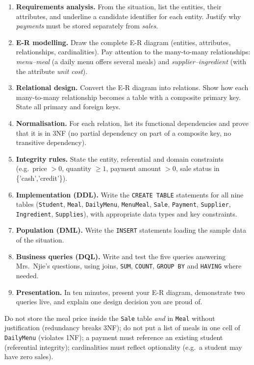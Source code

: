 \documentclass[11pt]{article}
\begin{document}
\begin{enumerate}
\item \textbf{Requirements analysis.} From the situation, list the entities, their attributes, and underline a candidate identifier for each entity. Justify why \emph{payments} must be stored separately from \emph{sales}.
\item \textbf{E-R modelling.} Draw the complete E-R diagram (entities, attributes, relationships, cardinalities). Pay attention to the many-to-many relationships: \emph{menu--meal} (a daily menu offers several meals) and \emph{supplier--ingredient} (with the attribute \emph{unit cost}).
\item \textbf{Relational design.} Convert the E-R diagram into relations. Show how each many-to-many relationship becomes a table with a composite primary key. State all primary and foreign keys.
\item \textbf{Normalisation.} For each relation, list its functional dependencies and prove that it is in 3NF (no partial dependency on part of a composite key, no transitive dependency).
\item \textbf{Integrity rules.} State the entity, referential and domain constraints (e.g.\ price $> 0$, quantity $\geq 1$, payment amount $> 0$, sale status in \{'cash','credit'\}).
\item \textbf{Implementation (DDL).} Write the \texttt{CREATE TABLE} statements for all nine tables (\texttt{Student}, \texttt{Meal}, \texttt{DailyMenu}, \texttt{MenuMeal}, \texttt{Sale}, \texttt{Payment}, \texttt{Supplier}, \texttt{Ingredient}, \texttt{Supplies}), with appropriate data types and key constraints.
\item \textbf{Population (DML).} Write the \texttt{INSERT} statements loading the sample data of the situation.
\item \textbf{Business queries (DQL).} Write and test the five queries answering Mrs.\ Njie's questions, using joins, \texttt{SUM}, \texttt{COUNT}, \texttt{GROUP BY} and \texttt{HAVING} where needed.
\item \textbf{Presentation.} In ten minutes, present your E-R diagram, demonstrate two queries live, and explain one design decision you are proud of.
\end{enumerate}

\begin{attention}
Do not store the meal price inside the \texttt{Sale} table \emph{and} in \texttt{Meal} without justification (redundancy breaks 3NF); do not put a list of meals in one cell of \texttt{DailyMenu} (violates 1NF); a payment must reference an existing student (referential integrity); cardinalities must reflect optionality (e.g.\ a student may have zero sales).
\end{attention}
\end{document}
